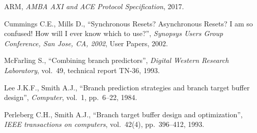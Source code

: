 \begin{thebibliography}{99}
    ARM, 
    \textit{AMBA AXI and ACE Protocol Specification},
    2017.

    Cummings C.E., Mills D.,
    ``Synchronous Resets? Asynchronous Resets? I am so confused! How will I ever know which to use?'',  
    \textit{Synopsys Users Group Conference, San Jose, CA, 2002},
    User Papers, 
    2002.

    McFarling S.,
    ``Combining branch predictors'',  
    \textit{Digital Western Research Laboratory},
    vol.~49, technical report TN-36, 
    1993.

    Lee J.K.F., Smith A.J.,
    ``Branch prediction strategies and branch target buffer design'',  
    \textit{Computer},
    vol.~1, pp.~6--22, 
    1984.

    Perleberg C.H., Smith A.J.,
    ``Branch target buffer design and optimization'',  
    \textit{IEEE transactions on computers},
    vol.~42(4), pp.~396--412, 
    1993.

\end{thebibliography}